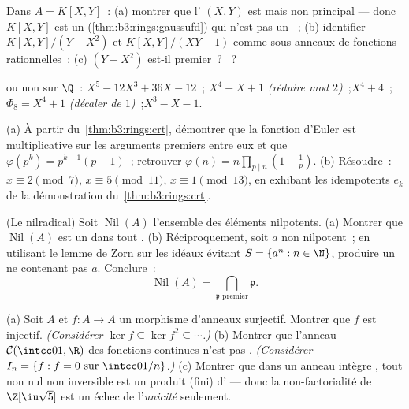 \begin{exercise}[$\star\star$]\label{exo:b3:rings:6}
Dans $A = K[X, Y]$~: (a) montrer que l' $(X, Y)$ est
 mais non principal --- donc $K[X,Y]$ est un 
(\cref{thm:b3:rings:gaussufd}) qui n'est pas un ~; (b)
identifier $K[X, Y]/(Y - X^2)$ et $K[X,Y]/(XY - 1)$ comme
sous-anneaux de fonctions rationnelles~; (c) $(Y - X^2)$
est-il premier~? ~?
\end{exercise}

\begin{exercise}[$\star\star$]\label{exo:b3:rings:7}
 ou non sur $\Q$~: $X^5 - 12X^3 + 36X - 12$~;\quad
$X^4 + X + 1$ \emph{(réduire mod $2$)}~;\quad $X^4 + 4$~;\quad
$\Phi_8 = X^4 + 1$ \emph{(décaler de $1$)}~;\quad $X^3 - X -
1$.
\end{exercise}

\begin{exercise}[$\star\star$]\label{exo:b3:rings:8}
(a) À partir du~\cref{thm:b3:rings:crt}, démontrer que la
fonction d'Euler est multiplicative sur les arguments premiers
entre eux et que $\varphi(p^k) = p^{k-1}(p-1)$~; retrouver
$\varphi(n) = n\prod_{p \mid n}(1 - \frac1p)$.
(b) Résoudre~: $x \equiv 2 \pmod 7$, $x \equiv 5 \pmod{11}$, $x
\equiv 1 \pmod{13}$, en exhibant les idempotents $e_k$ de la
démonstration du~\cref{thm:b3:rings:crt}.
\end{exercise}

\begin{exercise}[$\star\star\star$]\label{exo:b3:rings:9}
(Le nilradical) Soit $\operatorname{Nil}(A)$ l'ensemble des
éléments nilpotents. (a) Montrer que $\operatorname{Nil}(A)$ est
un   dans tout . (b) Réciproquement,
soit $a$ non nilpotent~; en utilisant le lemme de Zorn sur les
idéaux évitant $S = \{a^n : n \in \N\}$, produire un  ne contenant pas $a$. Conclure~:
\[
\operatorname{Nil}(A) = \bigcap_{\mathfrak p \text{ premier}}
\mathfrak p .
\]
\end{exercise}

\begin{exercise}[$\star\star\star$]\label{exo:b3:rings:10}
(a) Soit $A$  et $f \colon A \to A$ un morphisme
d'anneaux surjectif. Montrer que $f$ est injectif.
\emph{(Considérer $\ker f \subseteq \ker f^2 \subseteq
\cdots$.)}
(b) Montrer que l'anneau $\mathcal C(\intcc01, \R)$ des
fonctions continues n'est pas . \emph{(Considérer $I_n
= \{f : f = 0 \text{ sur } \intcc0{1/n}\}$.)}
(c) Montrer que dans un anneau intègre \emph{}, tout
non nul non inversible est un produit (fini) d' ---
donc la non-factorialité de $\Z[\iu\sqrt 5]$ est un échec de
l'\emph{unicité} seulement.
\end{exercise}

